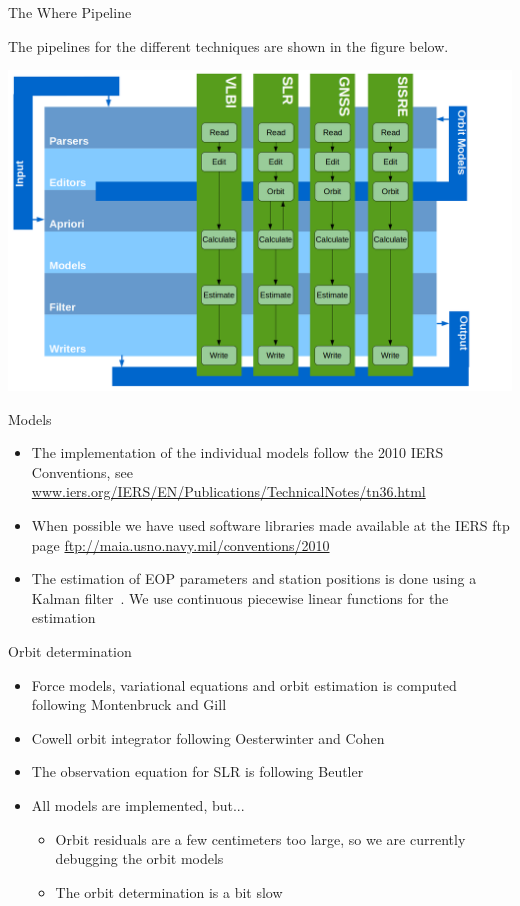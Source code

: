 \documentclass[12pt]{beamer}
\begin{document}
\begin{frame}{The Where Pipeline}

The pipelines for the different techniques are shown in the figure below. 

\begin{center}
  \includegraphics[height=0.7\textheight]{./figure/pipelines.png}
\end{center}

\end{frame}

\begin{frame}{Models}
\begin{itemize}
\item
  The implementation of the individual models follow the 2010 IERS Conventions, see \url{www.iers.org/IERS/EN/Publications/TechnicalNotes/tn36.html}
\item
  When possible we have used software libraries made available at the IERS ftp page \url{ftp://maia.usno.navy.mil/conventions/2010} 
\item 
  The estimation of EOP parameters and station positions is done using a Kalman filter~\cite{mysen2017}. We use continuous piecewise linear functions for the estimation
\end{itemize}
\end{frame}

\begin{frame}{Orbit determination}
\begin{itemize}
\item
  Force models, variational equations and orbit estimation is computed following Montenbruck and Gill~\cite{montenbruck2012}
\item 
  Cowell orbit integrator following Oesterwinter and Cohen~\cite{oesterwinter1972} 
\item
  The observation equation for SLR is following Beutler~\cite{beutler2005}
\item
  All models are implemented, but...
\begin{itemize}
\item 
  Orbit residuals are a few centimeters too large, so we are currently debugging the orbit models
\item
  The orbit determination is a bit slow
\end{itemize}
\end{itemize}
\end{frame}
\end{document}
